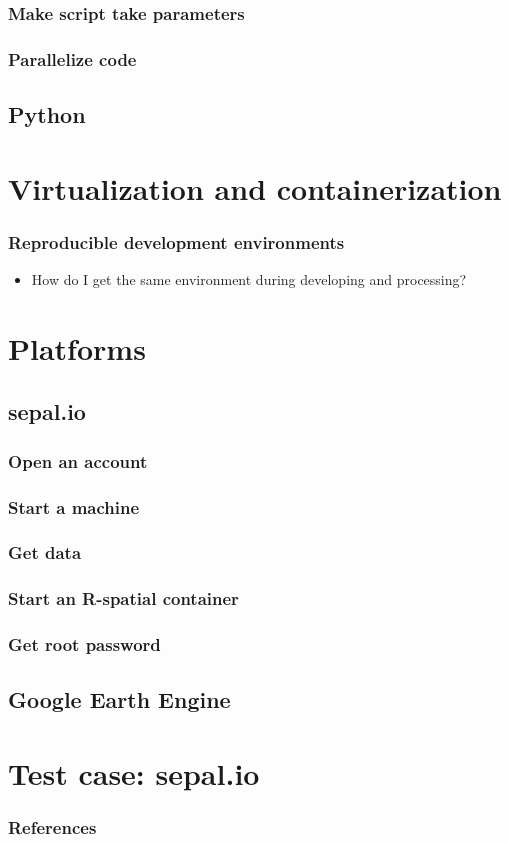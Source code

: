 \documentclass[aspectratio=169]{beamer}
\begin{document}
\begin{frame}
    \frametitle{Make script take parameters}
\end{frame}

\begin{frame}
    \frametitle{Parallelize code}
\end{frame}



\subsection{Python}


\section{Virtualization and containerization}

\begin{frame}
    \frametitle{Reproducible development environments}
    \begin{itemize}
        \item How do I get the same environment during developing and 
            processing?
    \end{itemize}
\end{frame}



\section{Platforms}



\subsection{sepal.io}

\begin{frame}
    \frametitle{Open an account}
\end{frame}

\begin{frame}
    \frametitle{Start a machine}
\end{frame}

\begin{frame}
    \frametitle{Get data}
\end{frame}

\begin{frame}
   \frametitle{Start an R-spatial container} 
\end{frame}

\begin{frame}
   \frametitle{Get root password} 
\end{frame}


\subsection{Google Earth Engine}



\section{Test case: sepal.io}







\begin{frame}[allowframebreaks]
	\frametitle{References}
	\printbibliography
\end{frame}
\end{document}
